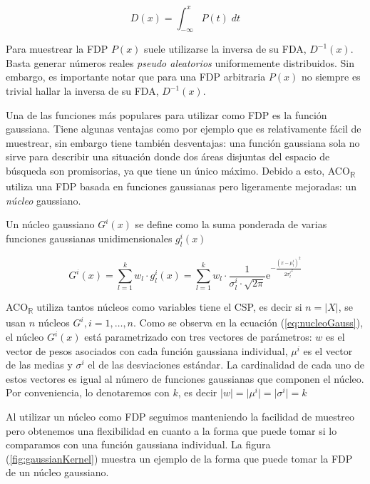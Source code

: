 \documentclass{llncs}
\begin{document}
	\begin{equation*}
	D(x) = \int_{-\infty}^{x}P(t)\;dt
	\end{equation*}
	
	Para muestrear la FDP $P(x)$ suele utilizarse la inversa de su FDA, $D^{-1}(x)$. Basta generar números 
	reales \textit{pseudo aleatorios} uniformemente distribuidos. Sin embargo, es importante notar que para una 
	FDP arbitraria $P(x)$ no siempre es trivial hallar la inversa de su FDA, $D^{-1}(x)$.
	
	Una de las funciones más populares para utilizar como FDP es la función gaussiana. Tiene algunas ventajas 
	como por ejemplo que es relativamente fácil de muestrear, sin embargo tiene también desventajas: una función
	gaussiana sola no sirve para describir una situación donde dos áreas disjuntas del espacio de búsqueda son 
	promisorias, ya que tiene un único máximo. Debido a esto, ACO\textsubscript{$\mathbb{R}$} utiliza una FDP basada 
	en funciones gaussianas pero ligeramente mejoradas: un \textit{núcleo} gaussiano.
	
	Un núcleo gaussiano $G^i(x)$ se define como la suma ponderada de varias funciones gaussianas unidimensionales $g^i_l(x)$
	
	\begin{equation}
	\label{eq:nucleoGauss}
	G^i(x) = \sum_{l=1}^{k}w_l \cdot g_l^i(x) = \sum_{l=1}^{k}w_l \cdot \frac{1}{\sigma_l^i \cdot \sqrt{2\pi}}\textrm{e}^{-\frac{(x - \mu^i_l)^2}{2{\sigma^i_l}^2}}
	\end{equation}

	ACO\textsubscript{$\mathbb{R}$} utiliza tantos núcleos como variables tiene el CSP, es decir si $n = \vert X \vert$, se usan $n$ núcleos $G^i, i = 1, \dots, n$. Como se observa en la ecuación (\ref{eq:nucleoGauss}), el núcleo $G^i(x)$ está parametrizado con tres vectores de parámetros: $w$ es el vector de pesos asociados con cada función gaussiana individual, $\mu^i$ es el vector de las medias y $\sigma^i$ el de las desviaciones estándar. La cardinalidad de cada uno de estos vectores es igual al número de funciones gaussianas que componen el núcleo. Por conveniencia, lo denotaremos con $k$, es decir $\vert w \vert = \vert \mu^i \vert = \vert \sigma^i \vert = k$
	
	Al utilizar un núcleo como FDP seguimos manteniendo la facilidad de muestreo pero obtenemos una flexibilidad en cuanto a la forma que puede tomar si lo comparamos con una función gaussiana individual. La figura (\ref{fig:gaussianKernel}) muestra un ejemplo de la forma que puede tomar la FDP de un núcleo gaussiano. 
	
\end{document}
